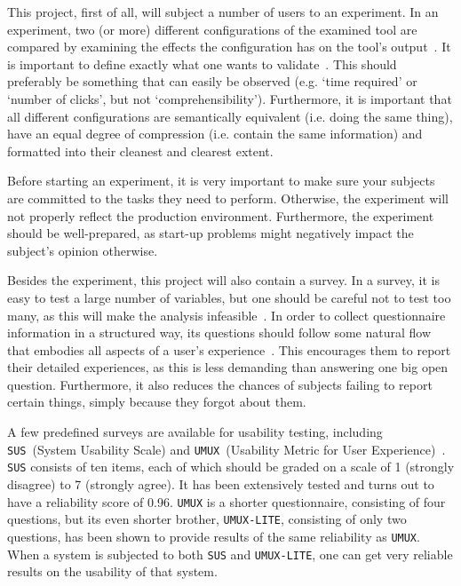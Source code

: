 This project, first of all, will subject a number of users to an experiment. In an experiment, two (or more) different configurations of the examined tool are compared by examining the effects the configuration has on the tool's output~\cite{wohlin2003empirical}. It is important to define exactly what one wants to validate~\cite{stein2009assessing}. This should preferably be something that can easily be observed (e.g. `time required' or `number of clicks', but not `comprehensibility'). Furthermore, it is important that all different configurations are semantically equivalent (i.e. doing the same thing), have an equal degree of compression (i.e. contain the same information) and formatted into their cleanest and clearest extent.

Before starting an experiment, it is very important to make sure your subjects are committed to the tasks they need to perform. Otherwise, the experiment will not properly reflect the production environment. Furthermore, the experiment should be well-prepared, as start-up problems might negatively impact the subject's opinion otherwise.

Besides the experiment, this project will also contain a survey. In a survey, it is easy to test a large number of variables, but one should be careful not to test too many, as this will make the analysis infeasible~\cite{wohlin2003empirical}. In order to collect questionnaire information in a structured way, its questions should follow some natural flow that embodies all aspects of a user's experience~\cite{tuch2013analyzing}. This encourages them to report their detailed experiences, as this is less demanding than answering one big open question. Furthermore, it also reduces the chances of subjects failing to report certain things, simply because they forgot about them.

A few predefined surveys are available for usability testing, including \verb|SUS|~(System Usability Scale) and \verb|UMUX|~(Usability Metric for User Experience)~\cite{lewis2013umux}. \verb|SUS| consists of ten items, each of which should be graded on a scale of 1 (strongly disagree) to 7 (strongly agree). It has been extensively tested and turns out to have a reliability score of 0.96. \verb|UMUX| is a shorter questionnaire, consisting of four questions, but its even shorter brother, \verb|UMUX-LITE|, consisting of only two questions, has been shown to provide results of the same reliability as \verb|UMUX|. When a system is subjected to both \verb|SUS| and \verb|UMUX-LITE|, one can get very reliable results on the usability of that system.

